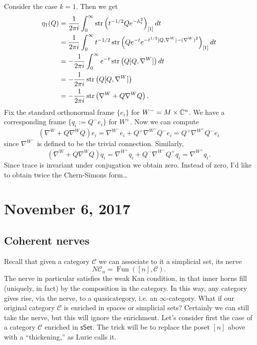 \documentclass{amsart}
\DeclareMathOperator{\Fun}{Fun}
\begin{document}
\begin{example}
    Consider the case $k=1$. Then we get
    \begin{align*}
        \eta_1(Q) &= \frac{1}{2\pi i}\int_0^\infty \operatorname{str}\left( t^{-1/2}Qe^{-\mathbb{A}_t^2} \right)_{[1]} dt\\
        &= \frac{1}{2\pi i}\int_0^\infty t^{-1/2}\operatorname{str}\left( Q e^{-t}e^{-t^{1/2}[Q,\nabla^W] - (\nabla^W)^2} \right)_{[1]} dt\\
        &= -\frac{1}{2\pi i}\int_0^\infty e^{-t}\operatorname{str}\left( Q[Q,\nabla^W] \right) dt \\
        &= -\frac{1}{2\pi i}\operatorname{str}\left( Q[Q,\nabla^W] \right) \\
        &= -\frac{1}{2\pi i}\operatorname{str}\left( \nabla^W + Q\nabla^WQ \right).
    \end{align*}
    Fix the standard orthonormal frame $\{e_i\}$ for $W^-=M\times\mathbb{C}^n$. We have a
    corresponding frame $\{q_i:=Q^-e_i\}$ for $W^+$. Now we can compute
    \begin{equation*}
        (\nabla^W+Q\nabla^WQ)e_i = \nabla^{W^-}e_i + Q^+\nabla^{W^+}Q^-e_i = Q^+\nabla^{W^+}Q^-e_i
    \end{equation*}
    since $\nabla^{W^-}$ is defined to be the trivial connection. Similarly,
    \begin{equation*}
        (\nabla^W+Q\nabla^WQ)q_i = \nabla^{W^+}q_i + Q^-\nabla^{W^-}Q^+q_i = \nabla^{W^+}q_i.
    \end{equation*}
    Since trace is invariant under conjugation we obtain zero.
    Instead of zero, I'd like to obtain twice the Chern-Simons form\ldots
\end{example}


\section{November 6, 2017}

\subsection{Coherent nerves}

Recall that given a category $\mathcal{C}$ we can associate to it a simplicial set,
its nerve
\begin{equation*}
    N\mathcal{C}_n = \Fun([n], \mathcal{C}).
\end{equation*}
The nerve in particular satisfies the weak Kan condition, in that inner horns fill
(uniquely, in fact) by the composition in the category. In this way, any category
gives rise, via the nerve, to a quasicategory, i.e. an $\infty$-category.
What if our original category $\mathcal{C}$ is enriched in spaces or simplicial
sets? Certainly we can still take the nerve, but this will ignore the enrichment.
Let's consider first the case of a category $\mathcal{C}$ enriched in $\mathsf{sSet}$.
The trick will be to replace the poset $[n]$ above with a ``thickening,'' as Lurie
calls it.
\end{document}
